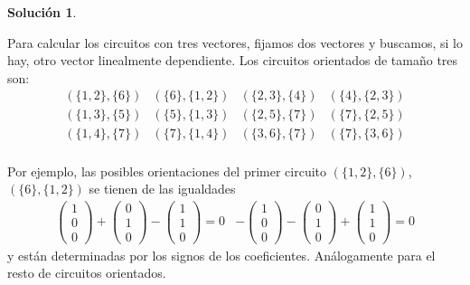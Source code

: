\documentclass[10pt]{article}
\theoremstyle{definition}
\newtheorem*{sol}{Solución}
\begin{document}
\begin{sol}
\begin{enumerate}[(a)]
Para calcular los circuitos con tres vectores, fijamos dos vectores y buscamos, si lo hay, otro vector linealmente dependiente. Los circuitos orientados de tamaño tres son:
$$\begin{array}{cc|cc}
     (\{1,2\},\{6\})& (\{6\},\{1,2\}) & (\{2,3\},\{4\}) & (\{4\},\{2,3\})\\
     (\{1,3\},\{5\})& (\{5\},\{1,3\}) & (\{2,5\},\{7\}) & (\{7\},\{2,5\})\\
     (\{1,4\},\{7\}) & (\{7\},\{1,4\}) & (\{3,6\},\{7\}) & (\{7\},\{3,6\})\\
\end{array}$$

Por ejemplo, las posibles orientaciones del primer circuito $(\{1,2\},\{6\})$, $(\{6\},\{1,2\})$ se tienen de las igualdades 
$$\begin{array}{ll}\begin{pmatrix}1\\ 0\\ 0\end{pmatrix} + \begin{pmatrix}0\\ 1\\ 0\end{pmatrix}-\begin{pmatrix}1\\ 1\\ 0\end{pmatrix}=0 & -\begin{pmatrix}1\\ 0\\ 0\end{pmatrix}-\begin{pmatrix}0\\ 1\\ 0\end{pmatrix}+\begin{pmatrix}1\\ 1\\ 0\end{pmatrix}=0\end{array}$$
y están determinadas por los signos de los coeficientes. Análogamente para el resto de circuitos orientados.



\end{enumerate}
\end{sol}
\end{document}
